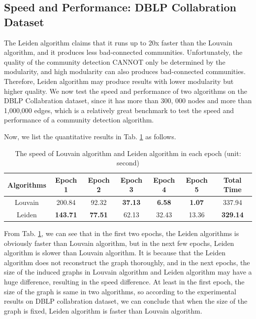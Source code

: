 \documentclass[12pt, a4paper]{article}
\theoremstyle{definition}
\begin{document}
\subsection{Speed and Performance: DBLP Collabration Dataset}
The Leiden algorithm claims that it runs up to 20x faster than the Louvain algorithm, and it produces less bad-connected communities. Unfortunately, the quality of the community detection CANNOT only be determined by the modularity, and high modularity can also produces bad-connected communities. Therefore, Leiden algorithm may produce results with lower modularity but higher quality. We now test the speed and performance of two algorithms on the DBLP Collabration dataset, since it has more than 300, 000 nodes and more than 1,000,000 edges, which is a relatively great benchmark to test the speed and performance of a community detection algorithm.

Now, we list the quantitative results in Tab. \ref{tab:expr-speed-1} as follows.

\begin{table}[htbp]
    \centering
    \begin{tabular}{ccccccc}
        \hline 
        Algorithms & Epoch 1 & Epoch 2 &  Epoch 3 & Epoch 4 & Epoch 5 & Total Time \\
        \hline
        Louvain & 200.84 & 92.32 & \textbf{37.13} & \textbf{6.58} & \textbf{1.07} & 337.94 \\
		Leiden & \textbf{143.71} & \textbf{77.51} & 62.13 & 32.43 & 13.36 & \textbf{329.14}\\
        \hline
    \end{tabular}
    \caption{The speed of Louvain algorithm and Leiden algorithm in each epoch (unit: second)}
    \label{tab:expr-speed-1}
\end{table}

From Tab. \ref{tab:expr-speed-1}, we can see that in the first two epochs, the Leiden algorithms is obviously faster than Louvain algorithm, but in the next few epochs, Leiden algorithm is slower than Louvain algorithm. It is because that the Leiden algorithm does not reconstruct the graph thoroughly, and in the next epochs, the size of the induced graphs in Louvain algorithm and Leiden algorithm may have a huge difference, resulting in the speed difference. At least in the first epoch, the size of the graph is same in two algorithms, so according to the experimental results on DBLP collabration dataset, we can conclude that when the size of the graph is fixed, Leiden algorithm is faster than Louvain algorithm.
\end{document}
